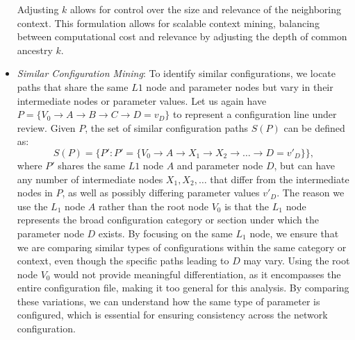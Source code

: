 \begin{itemize}
Adjusting \( k \) allows for control over the size and relevance of the neighboring context. This formulation allows for scalable context mining, balancing between computational cost and relevance by adjusting the depth of common ancestry \( k \).
    


\item \textit{Similar Configuration Mining}: To identify similar configurations, we locate paths that share the same \(L1\) node and parameter nodes but vary in their intermediate nodes or parameter values. Let us again have \(
P = \{ V_0 \rightarrow A \rightarrow B \rightarrow C \rightarrow D = v_D \}
\) to represent a configuration line under review.
Given \( P \), the set of similar configuration paths \( S(P) \) can be defined as:
\[
S(P) = \{ P' : P' = \{ V_0 \rightarrow A \rightarrow X_1 \rightarrow X_2 \rightarrow \dots \rightarrow D = v'_D \} \},
\]
where \( P' \) shares the same \(L1\) node \( A \) and parameter node \( D \), but can have any number of intermediate nodes \( X_1, X_2, \dots \) that differ from the intermediate nodes in \( P \), as well as possibly differing parameter values \( v'_D \).
The reason we use the \( L_1 \) node \( A \) rather than the root node \( V_0 \) is that the \( L_1 \) node represents the broad configuration category or section under which the parameter node \( D \) exists. By focusing on the same \( L_1 \) node, we ensure that we are comparing similar types of configurations within the same category or context, even though the specific paths leading to \( D \) may vary. Using the root node \( V_0 \) would not provide meaningful differentiation, as it encompasses the entire configuration file, making it too general for this analysis. By comparing these variations, we can understand how the same type of parameter is configured, which is essential for ensuring consistency across the network configuration.




\end{itemize}
